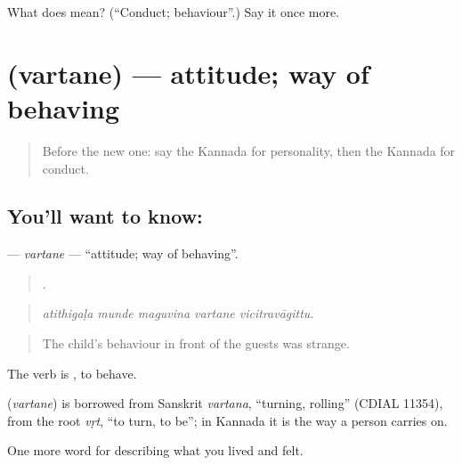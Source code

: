 \begin{tcolorbox}[breakable,colback=teal!4,colframe=teal!35!black,title={Before you move on}]
What does  mean? (\textquotedblleft{}Conduct; behaviour\textquotedblright{}.) Say it once more.
\end{tcolorbox}
\section[\texorpdfstring{\kn{ವರ್ತನೆ} (vartane)}{ವರ್ತನೆ (vartane)}]{ (vartane) — attitude; way of behaving}

\label{lesson:KA-C500-vartane}



\begin{quote}
Before the new one: say the Kannada for personality, then the Kannada for conduct.
\end{quote}

\subsection*{You'll want to know: }
\textbf{} — \emph{vartane} — \textquotedblleft{}attitude; way of behaving\textquotedblright{}.

\begin{quote}
    .
\end{quote}

\begin{quote}
\emph{atithigaḷa munde maguvina vartane vicitravāgittu.}
\end{quote}

\begin{quote}
The child's behaviour in front of the guests was strange.
\end{quote}

The verb is , to behave.

\begin{cousinweb}
\textbf{} (\emph{vartane}) is borrowed from Sanskrit \emph{vartana}, \textquotedblleft{}turning, rolling\textquotedblright{} (CDIAL 11354), from the root \emph{vṛt}, \textquotedblleft{}to turn, to be\textquotedblright{}; in Kannada it is the way a person carries on.
\end{cousinweb}

\begin{grammarlens}[title={What you've built}]
One more word for describing what you lived and felt.
\end{grammarlens}

